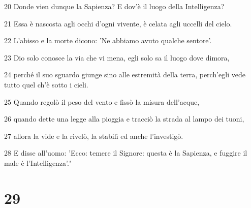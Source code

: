 \par 20 Donde vien dunque la Sapienza? E dov'è il luogo della Intelligenza?
\par 21 Essa è nascosta agli occhi d'ogni vivente, è celata agli uccelli del cielo.
\par 22 L'abisso e la morte dicono: 'Ne abbiamo avuto qualche sentore'.
\par 23 Dio solo conosce la via che vi mena, egli solo sa il luogo dove dimora,
\par 24 perché il suo sguardo giunge sino alle estremità della terra, perch'egli vede tutto quel ch'è sotto i cieli.
\par 25 Quando regolò il peso del vento e fissò la misura dell'acque,
\par 26 quando dette una legge alla pioggia e tracciò la strada al lampo dei tuoni,
\par 27 allora la vide e la rivelò, la stabilì ed anche l'investigò.
\par 28 E disse all'uomo: 'Ecco: temere il Signore: questa è la Sapienza, e fuggire il male è l'Intelligenza'."

\chapter{29}


